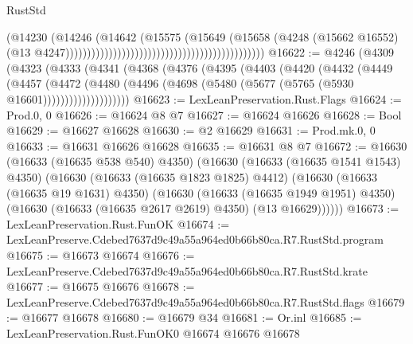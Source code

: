 \begin{lexlean}{RustStd}
\begin{coremodule}
                                                                                (@14230
                                                                                  (@14246
                                                                                    (@14642
                                                                                      (@15575
                                                                                        (@15649
                                                                                          (@15658
                                                                                            (@4248
                                                                                              (@15662
                                                                                                @16552)
                                                                                              (@13
                                                                                                @4247))))))))))))))))))))))))))))))))))))))))))))))
@16622 := @4246
    (@4309
      (@4323
        (@4333
          (@4341
            (@4368
              (@4376
                (@4395
                  (@4403
                    (@4420
                      (@4432
                        (@4449
                          (@4457
                            (@4472
                              (@4480
                                (@4496 (@4698 (@5480 (@5677 (@5765 (@5930 @16601))))))))))))))))))))
@16623 := LexLeanPreservation.Rust.Flags
@16624 := Prod.{0, 0}
@16626 := @16624 @8 @7
@16627 := @16624 @16626
@16628 := Bool
@16629 := @16627 @16628
@16630 := @2 @16629
@16631 := Prod.mk.{0, 0}
@16633 := @16631 @16626 @16628
@16635 := @16631 @8 @7
@16672 := @16630
    (@16633 (@16635 @538 @540) @4350)
    (@16630
      (@16633 (@16635 @1541 @1543) @4350)
      (@16630
        (@16633 (@16635 @1823 @1825) @4412)
        (@16630
          (@16633 (@16635 @19 @1631) @4350)
          (@16630
            (@16633 (@16635 @1949 @1951) @4350)
            (@16630 (@16633 (@16635 @2617 @2619) @4350) (@13 @16629))))))
@16673 := LexLeanPreservation.Rust.FunOK
@16674 := LexLeanPreserve.Cdebed7637d9c49a55a964ed0b66b80ca.R7.RustStd.program
@16675 := @16673 @16674
@16676 := LexLeanPreserve.Cdebed7637d9c49a55a964ed0b66b80ca.R7.RustStd.krate
@16677 := @16675 @16676
@16678 := LexLeanPreserve.Cdebed7637d9c49a55a964ed0b66b80ca.R7.RustStd.flags
@16679 := @16677 @16678
@16680 := @16679 @34
@16681 := Or.inl
@16685 := LexLeanPreservation.Rust.FunOK0 @16674 @16676 @16678

\end{coremodule}
\end{lexlean}
